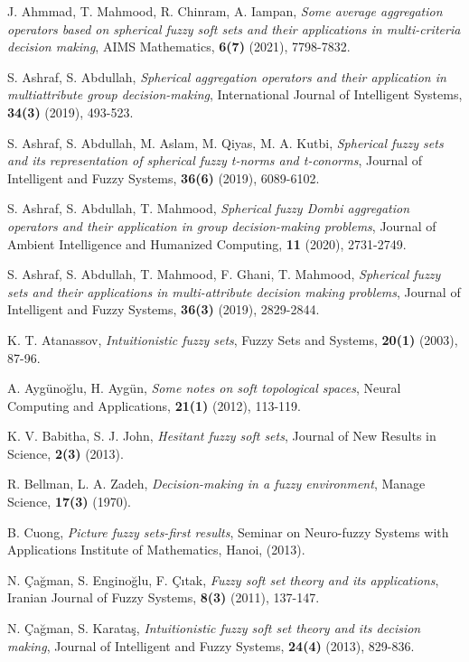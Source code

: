 \documentclass{IJFS}
\begin{document}
\begin{thebibliography}{1}
 J. Ahmmad, T. Mahmood, R. Chinram, A. Iampan, {\it Some average aggregation operators based on spherical fuzzy soft sets and their applications in multi-criteria decision making}, AIMS Mathematics, {\bf 6(7)} (2021), 7798-7832.

 S. Ashraf, S. Abdullah, {\it Spherical aggregation operators and their
application in multiattribute group decision-making}, International
Journal of Intelligent Systems, {\bf 34(3)} (2019), 493-523.

 S. Ashraf, S. Abdullah, M. Aslam, M. Qiyas, M. A. Kutbi,
 {\it Spherical fuzzy sets and its representation of spherical fuzzy t-norms and t-conorms},
  Journal of Intelligent and Fuzzy Systems, {\bf 36(6)} (2019), 6089-6102.

 S. Ashraf, S. Abdullah, T. Mahmood, {\it Spherical fuzzy Dombi aggregation
operators and their application in group decision-making problems},
Journal of Ambient Intelligence and Humanized Computing, {\bf 11} (2020),
2731-2749.

 S. Ashraf, S. Abdullah, T. Mahmood, F. Ghani, T. Mahmood, {\it Spherical
fuzzy sets and their applications in multi-attribute decision
making problems}, Journal of Intelligent and Fuzzy Systems, {\bf 36(3)} (2019),
2829-2844.


 K. T. Atanassov, {\it Intuitionistic fuzzy sets}, Fuzzy Sets and
Systems, {\bf 20(1)} (2003), 87-96.


 A. Ayg\"{u}no\u glu, H. Ayg\"{u}n, {\it Some notes on soft topological spaces}, Neural Computing and Applications, {\bf 21(1)} (2012), 113-119.

 K. V. Babitha, S. J. John, {\it Hesitant fuzzy soft sets}, Journal of New Results in Science, {\bf 2(3)} (2013).

 R. Bellman, L. A. Zadeh, {\it Decision-making in a fuzzy
environment}, Manage Science, {\bf 17(3)} (1970).



 B. Cuong, {\it Picture fuzzy sets-first results},  Seminar on
Neuro-fuzzy Systems with Applications Institute of Mathematics,
Hanoi, (2013).

 N. \c{C}a\u gman, S. Engino\u glu,  F. \c{C}\i tak, {\it Fuzzy soft set theory and its applications}, Iranian Journal of Fuzzy Systems, {\bf 8(3)} (2011), 137-147.

  N. \c{C}a\u gman, S. Karata\c s,  {\it Intuitionistic fuzzy soft set theory and its decision making}, Journal of Intelligent and Fuzzy Systems, {\bf 24(4)} (2013), 829-836.


\end{thebibliography}
\end{document}
